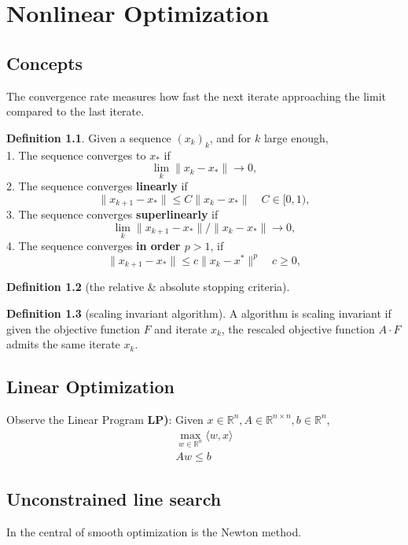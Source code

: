 \documentclass[a4paper,11pt,fleqn, draft]{book}
\theoremstyle{definition}
\newtheorem{definition}{Definition}[section]
\theoremstyle{remark}
\newcommand{\xkone}{\ensuremath{x_{k+1}}}
\begin{document}
\chapter{Nonlinear Optimization}
\section{Concepts}
The convergence rate measures how fast the next iterate approaching the limit compared to the last iterate. 
\begin{definition}
	Given a sequence $(x_k)_k$, and for $k$ large enough,\\
	1. The sequence converges to $x_*$ if
	\[ \lim_k \|x_k - x_*\| \rightarrow 0 ,\]
	2. The sequence converges \textbf{linearly} if
	\[ \| \xkone - x_* \| \le C \| x_k - x_*\| \quad C \in [0,1 ) ,\]
	3. The sequence converges \textbf{superlinearly} if 
	\[ \lim_k \| \xkone - x_*\| / \|x_k - x_* \| \rightarrow 0, \]
	4. The sequence converges \textbf{in order $p > 1$}, if 
	\[ \|\xkone - x_*\| \le c \| x_k - x^*\|^p \quad c \ge 0, \]
\end{definition}

\begin{definition}[the relative \& absolute stopping criteria]
	
\end{definition}

\begin{definition}[scaling invariant algorithm]
	A algorithm is scaling invariant if given the objective function $F$ and iterate $x_k$, the rescaled objective 
	function $A \cdot F$ admits the same iterate $x_k$. 
\end{definition}


\section{Linear Optimization}
Observe the Linear Program \textbf{LP)}: Given $x \in \mathbb{R}^n, A \in \mathbb{R}^{n \times n}, b \in \mathbb{R}^n$, 
\begin{align*}
	\max_{w \in \mathbb{R}^n} \langle w , x \rangle\\
	Aw \le b
\end{align*}

\section{Unconstrained line search}
In the central of smooth optimization is the Newton method. 
\end{document}
